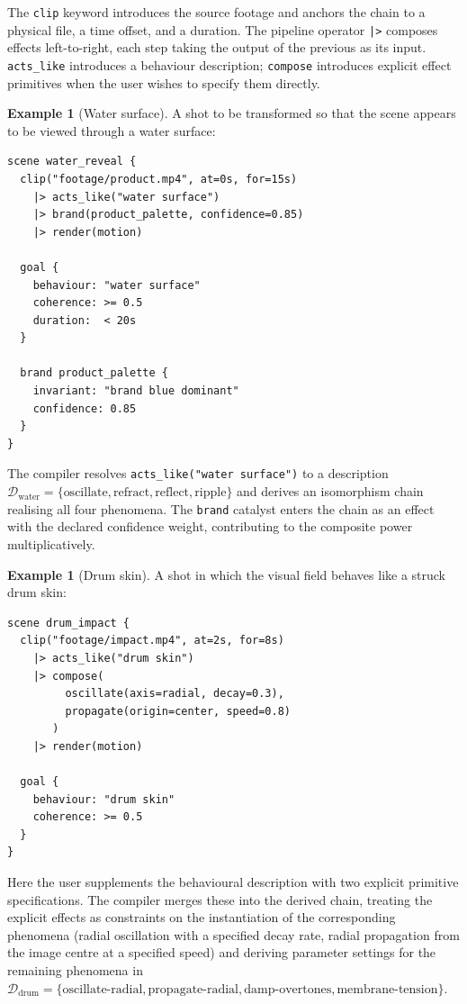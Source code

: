 \documentclass[twocolumn,11pt,a4paper]{article}
\theoremstyle{mee}
\theoremstyle{definition}
\newtheorem{example}[theorem]{Example}
\theoremstyle{remark}
\newcommand{\Desc}{\mathcal{D}}
\begin{document}
The \texttt{clip} keyword introduces the source footage and anchors the
chain to a physical file, a time offset, and a duration. The pipeline
operator \texttt{|>} composes effects left-to-right, each step taking the
output of the previous as its input. \texttt{acts\_like} introduces a
behaviour description; \texttt{compose} introduces explicit effect
primitives when the user wishes to specify them directly.

\begin{example}[Water surface]
\label{ex:water}
A shot to be transformed so that the scene appears to be viewed through a
water surface:

\begin{lstlisting}[caption={Water surface scene}]
scene water_reveal {
  clip("footage/product.mp4", at=0s, for=15s)
    |> acts_like("water surface")
    |> brand(product_palette, confidence=0.85)
    |> render(motion)

  goal {
    behaviour: "water surface"
    coherence: >= 0.5
    duration:  < 20s
  }

  brand product_palette {
    invariant: "brand blue dominant"
    confidence: 0.85
  }
}
\end{lstlisting}

The compiler resolves \texttt{acts\_like("water surface")} to a
description $\Desc_{\text{water}}=\{\text{oscillate},
\text{refract},\text{reflect},\text{ripple}\}$ and derives an isomorphism
chain realising all four phenomena. The \texttt{brand} catalyst enters the
chain as an effect with the declared confidence weight, contributing to
the composite power multiplicatively.
\end{example}

\begin{example}[Drum skin]
\label{ex:drum}
A shot in which the visual field behaves like a struck drum skin:

\begin{lstlisting}[caption={Drum skin scene}]
scene drum_impact {
  clip("footage/impact.mp4", at=2s, for=8s)
    |> acts_like("drum skin")
    |> compose(
         oscillate(axis=radial, decay=0.3),
         propagate(origin=center, speed=0.8)
       )
    |> render(motion)

  goal {
    behaviour: "drum skin"
    coherence: >= 0.5
  }
}
\end{lstlisting}

Here the user supplements the behavioural description with two explicit
primitive specifications. The compiler merges these into the derived chain,
treating the explicit effects as constraints on the instantiation of
the corresponding phenomena (radial oscillation with a specified decay
rate, radial propagation from the image centre at a specified speed) and
deriving parameter settings for the remaining phenomena in
$\Desc_{\text{drum}}=\{\text{oscillate-radial},\text{propagate-radial},
\text{damp-overtones},\text{membrane-tension}\}$.
\end{example}
\end{document}
